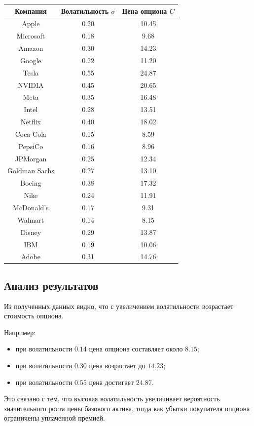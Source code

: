\begin{center}
\begin{tabular}{|c|c|c|}
\hline
Компания & Волатильность \(\sigma\) & Цена опциона \(C\) \\
\hline
Apple & 0.20 & 10.45 \\
Microsoft & 0.18 & 9.68 \\
Amazon & 0.30 & 14.23 \\
Google & 0.22 & 11.20 \\
Tesla & 0.55 & 24.87 \\
NVIDIA & 0.45 & 20.65 \\
Meta & 0.35 & 16.48 \\
Intel & 0.28 & 13.51 \\
Netflix & 0.40 & 18.02 \\
Coca-Cola & 0.15 & 8.59 \\
PepsiCo & 0.16 & 8.96 \\
JPMorgan & 0.25 & 12.34 \\
Goldman Sachs & 0.27 & 13.10 \\
Boeing & 0.38 & 17.32 \\
Nike & 0.24 & 11.91 \\
McDonald's & 0.17 & 9.31 \\
Walmart & 0.14 & 8.15 \\
Disney & 0.29 & 13.87 \\
IBM & 0.19 & 10.06 \\
Adobe & 0.31 & 14.76 \\
\hline
\end{tabular}
\end{center}

\subsection*{Анализ результатов}

Из полученных данных видно, что с увеличением волатильности возрастает стоимость опциона.

Например:
\begin{itemize}
    \item при волатильности \(0.14\) цена опциона составляет около \(8.15\);
    \item при волатильности \(0.30\) цена возрастает до \(14.23\);
    \item при волатильности \(0.55\) цена достигает \(24.87\).
\end{itemize}

Это связано с тем, что высокая волатильность увеличивает вероятность значительного роста цены базового актива, тогда как убытки покупателя опциона ограничены уплаченной премией.

